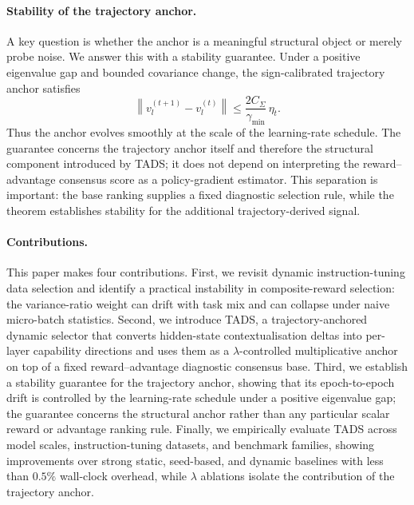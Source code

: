 \paragraph{Stability of the trajectory anchor.}
A key question is whether the anchor is a meaningful structural
object or merely probe noise. We answer this with a stability
guarantee. Under a positive eigenvalue gap and bounded covariance
change, the sign-calibrated trajectory anchor satisfies
\[
\left\|
v_l^{(t+1)}-v_l^{(t)}
\right\|
\le
\frac{2C_\Sigma}{\gamma_{\min}}\,\eta_t .
\]
Thus the anchor evolves smoothly at the scale of the learning-rate
schedule. The guarantee concerns the trajectory anchor itself and
therefore the structural component introduced by \textsc{TADS}; it
does not depend on interpreting the reward--advantage consensus score as
a policy-gradient estimator. This separation is important: the base
ranking supplies a fixed diagnostic selection rule, while the theorem
establishes stability for the additional trajectory-derived signal.

\paragraph{Contributions.}
This paper makes four contributions. First, we revisit dynamic
instruction-tuning data selection and identify a practical
instability in composite-reward selection: the variance-ratio weight
can drift with task mix and can collapse under naive micro-batch
statistics. Second, we introduce \textsc{TADS}, a trajectory-anchored
dynamic selector that converts hidden-state contextualisation deltas
into per-layer capability directions and uses them as a
$\lambda$-controlled multiplicative anchor on top of a fixed
reward--advantage diagnostic consensus base. Third, we establish a
stability guarantee for the trajectory anchor, showing that its
epoch-to-epoch drift is controlled by the learning-rate schedule
under a positive eigenvalue gap; the guarantee concerns the
structural anchor rather than any particular scalar reward or advantage
ranking rule. Finally, we empirically evaluate \textsc{TADS} across
model scales, instruction-tuning datasets, and benchmark families,
showing improvements over strong static, seed-based, and dynamic
baselines with less than $0.5\%$ wall-clock overhead, while
$\lambda$ ablations isolate the contribution of the trajectory
anchor.
